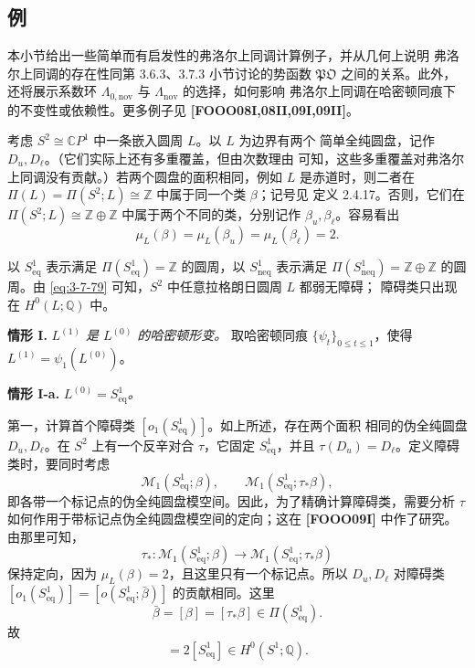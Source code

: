 
\subsection{例}
\label{subsec:3-7-6}

本小节给出一些简单而有启发性的弗洛尔上同调计算例子，并从几何上说明
弗洛尔上同调的存在性同第 3.6.3、3.7.3 小节讨论的势函数
$\mathfrak{PO}$ 之间的关系。此外，还将展示系数环
$\Lambda_{0,\mathrm{nov}}$ 与 $\Lambda_{\mathrm{nov}}$ 的选择，如何影响
弗洛尔上同调在哈密顿同痕下的不变性或依赖性。更多例子见
\textbf{[FOOO08I,08II,09I,09II]}。

考虑 $S^2\cong\mathbb CP^1$ 中一条嵌入圆周 $L$。以 $L$ 为边界有两个
简单全纯圆盘，记作 $D_u,D_\ell$。（它们实际上还有多重覆盖，但由次数理由
可知，这些多重覆盖对弗洛尔上同调没有贡献。）若两个圆盘的面积相同，例如
$L$ 是赤道时，则二者在
$\Pi(L)=\Pi(S^2;L)\cong\mathbb Z$ 中属于同一个类 $\beta$；记号见
定义 2.4.17。否则，它们在
$\Pi(S^2;L)\cong\mathbb Z\oplus\mathbb Z$ 中属于两个不同的类，分别记作
$\beta_u,\beta_\ell$。容易看出
\begin{equation}
 \mu_L(\beta)=\mu_L(\beta_u)=\mu_L(\beta_\ell)=2.
\tag{3.7.79}\label{eq:3-7-79}
\end{equation}

以 $S^1_{\mathrm{eq}}$ 表示满足
$\Pi(S^1_{\mathrm{eq}})=\mathbb Z$ 的圆周，以
$S^1_{\mathrm{neq}}$ 表示满足
$\Pi(S^1_{\mathrm{neq}})=\mathbb Z\oplus\mathbb Z$ 的圆周。由
\eqref{eq:3-7-79} 可知，$S^2$ 中任意拉格朗日圆周 $L$ 都弱无障碍；
障碍类只出现在 $H^0(L;\mathbb Q)$ 中。

\par\medskip
\noindent\textbf{情形 I.}\enspace
\textit{$L^{(1)}$ 是 $L^{(0)}$ 的哈密顿形变。}
取哈密顿同痕 $\{\psi_t\}_{0\leq t\leq1}$，使得
$L^{(1)}=\psi_1(L^{(0)})$。

\par\medskip
\noindent\textbf{情形 I-a.}\enspace
\textit{$L^{(0)}=S^1_{\mathrm{eq}}$。}

第一，计算首个障碍类 $[o_1(S^1_{\mathrm{eq}})]$。如上所述，存在两个面积
相同的伪全纯圆盘 $D_u,D_\ell$。在 $S^2$ 上有一个反辛对合 $\tau$，它固定
$S^1_{\mathrm{eq}}$，并且 $\tau(D_u)=D_\ell$。定义障碍类时，要同时考虑
\[
 \mathcal M_1(S^1_{\mathrm{eq}};\beta),
 \qquad
 \mathcal M_1(S^1_{\mathrm{eq}};\tau_*\beta),
\]
即各带一个标记点的伪全纯圆盘模空间。因此，为了精确计算障碍类，需要分析
$\tau$ 如何作用于带标记点伪全纯圆盘模空间的定向；这在
\textbf{[FOOO09I]} 中作了研究。由那里可知，
\[
 \tau_*\colon
 \mathcal M_1(S^1_{\mathrm{eq}};\beta)
 \longrightarrow
 \mathcal M_1(S^1_{\mathrm{eq}};\tau_*\beta)
\]
保持定向，因为 $\mu_L(\beta)=2$，且这里只有一个标记点。所以
$D_u,D_\ell$ 对障碍类
$[o_1(S^1_{\mathrm{eq}})]=[o(S^1_{\mathrm{eq}};\bar\beta)]$
的贡献相同。这里
\[
 \bar\beta=[\beta]=[\tau_*\beta]\in\Pi(S^1_{\mathrm{eq}}).
\]
故
\begin{equation}
 [o(S^1_{\mathrm{eq}};\bar\beta)]
 =2[S^1_{\mathrm{eq}}]\in H^0(S^1;\mathbb Q).
\tag{3.7.80}\label{eq:3-7-80}
\end{equation}


